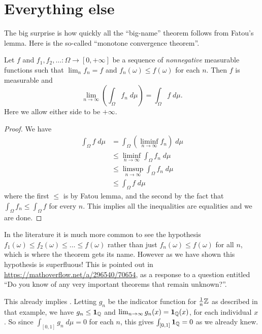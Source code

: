 \section{Everything else}
The big surprise is how quickly all the ``big-name''
theorem follows from Fatou's lemma.
Here is the so-called ``monotone convergence theorem''.
\begin{corollary}
	Let $f$ and $f_1, f_2, \dots \colon \Omega \to [0,+\infty]$
	be a sequence of \emph{nonnegative}
	measurable functions such that $\lim_n f_n = f$
	and $f_n(\omega) \le f(\omega)$ for each $n$.
	Then $f$ is measurable and
	\[ \lim_{n \to \infty} \left( \int_\Omega f_n \; d\mu \right)
		= \int_\Omega f \; d\mu. \]
	Here we allow either side to be $+\infty$.
\end{corollary}
\begin{proof}
	We have
	\begin{align*}
		\int_\Omega f \; d\mu
		&= \int_\Omega \left( \liminf_{n \to \infty} f_n \right) \; d\mu \\
		&\le \liminf_{n \to \infty} \int_\Omega f_n \; d\mu \\
		&\le \limsup_{n \to \infty} \int_\Omega f_n \; d\mu \\
		&\le \int_\Omega f \; d\mu
	\end{align*}
	where the first $\le$ is by Fatou lemma,
	and the second by the fact that
	$\int_\Omega f_n \le \int_\Omega f$ for every $n$.
	This implies all the inequalities are equalities and we are done.
\end{proof}
\begin{remark}
	In the literature it is much more common
	to see the hypothesis $f_1(\omega) \le f_2(\omega) \le \dots \le f(\omega)$
	rather than just $f_n(\omega) \le f(\omega)$ for all $n$,
	which is where the theorem gets its name.
	However as we have shown this hypothesis is superfluous!
	This is pointed out in \url{https://mathoverflow.net/a/296540/70654},
	as a response to a question entitled
	``Do you know of any very important theorems that remain unknown?''.
\end{remark}

\begin{example}
	This already implies .
	Letting $g_n$ be the indicator function for $\frac1n\mathbb Z$
	as described in that example, we have $g_n \le \mathbf{1}_\mathbb Q$
	and $\lim_{n \to \infty} g_n(x) = \mathbf{1}_\mathbb Q(x)$,
	for each individual $x$.
	So since $\int_{[0,1]} g_n \; d\mu = 0$ for each $n$,
	this gives $\int_{[0,1]} \mathbf{1}_\mathbb Q = 0$ as we already knew.
\end{example}

